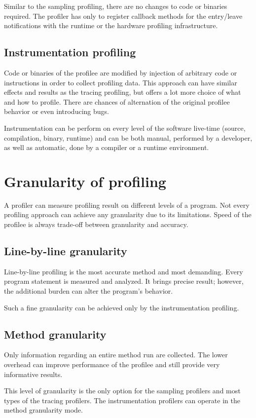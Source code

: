 Similar to the sampling profiling, there are no changes to code or binaries required. The profiler has only to register callback methods for the entry/leave notifications with the runtime or the hardware profiling infrastructure.

\subsection{Instrumentation profiling}
Code or binaries of the profilee are modified by injection of arbitrary code or instructions in order to collect profiling data. This approach can have similar effects and results as the tracing profiling, but offers a lot more choice of what and how to profile. There are chances of alternation of the original profilee behavior or even introducing bugs.

Instrumentation can be perform on every level of the software live-time (source, compilation, binary, runtime) and can be both manual, performed by a developer, as well as automatic, done by a compiler or a runtime environment.

\section{Granularity of profiling}
A profiler can measure profiling result on different levels of a program. Not every profiling approach can achieve any granularity due to its limitations. Speed of the profilee is always trade-off between granularity and accuracy. 

\subsection{Line-by-line granularity}
Line-by-line profiling is the most accurate method and most demanding. Every program statement is measured and analyzed. It brings precise result; however, the additional burden can alter the program's behavior.

Such a fine granularity can be achieved only by the instrumentation profiling.

\subsection{Method granularity} 
Only information regarding an entire method run are collected. The lower overhead can improve performance of the profilee and still provide very informative results.

This level of granularity is the only option for the sampling profilers and most types of the tracing profilers. The instrumentation profilers can operate in the method granularity mode.

